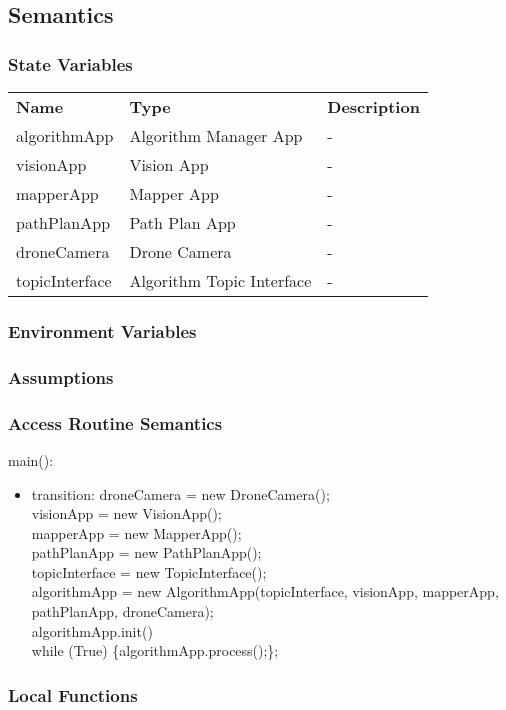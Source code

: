 \documentclass[12pt, titlepage]{article}
\begin{document}
\subsection{Semantics}
\subsubsection{State Variables}
\begin{center}
\begin{tabular}{p{3 cm} p{4cm} p{5cm} }
\hline
\textbf{Name} & \textbf{Type} & \textbf{Description}  \\
algorithmApp & Algorithm Manager App & - \\
visionApp & Vision App & - \\
mapperApp & Mapper App & - \\
pathPlanApp & Path Plan App & - \\
droneCamera & Drone Camera & - \\
topicInterface & Algorithm Topic Interface & - \\
\hline
\hline
\end{tabular}
\end{center}
\subsubsection{Environment Variables}
\subsubsection{Assumptions}
\subsubsection{Access Routine Semantics}
\noindent main():
\begin{itemize}
\item transition: 
droneCamera = new DroneCamera();\\
visionApp = new VisionApp();\\
mapperApp = new MapperApp();\\
pathPlanApp = new PathPlanApp();\\
topicInterface = new TopicInterface();\\
algorithmApp = new AlgorithmApp(topicInterface, visionApp, mapperApp, pathPlanApp, droneCamera);\\
algorithmApp.init() \\
while (True) \{algorithmApp.process();\};
\end{itemize}
\subsubsection{Local Functions}
\newpage
\end{document}
